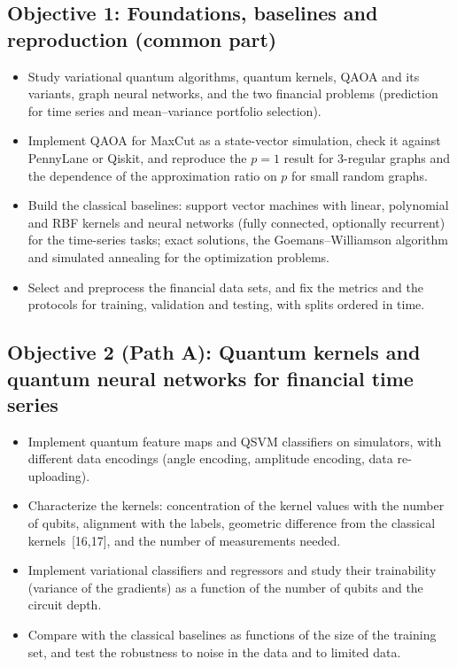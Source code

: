 \documentclass[12pt,a4paper]{article}
\begin{document}
\subsection*{Objective 1: Foundations, baselines and reproduction (common part)}
\begin{itemize}
  \item Study variational quantum algorithms, quantum kernels, QAOA
  and its variants, graph neural networks, and the two financial
  problems (prediction for time series and mean--variance portfolio
  selection).
  \item Implement QAOA for MaxCut as a state-vector simulation, check
  it against PennyLane or Qiskit, and reproduce the $p=1$ result for
  3-regular graphs and the dependence of the approximation ratio on
  $p$ for small random graphs.
  \item Build the classical baselines: support vector machines with
  linear, polynomial and RBF kernels and neural networks (fully
  connected, optionally recurrent) for the time-series tasks; exact
  solutions, the Goemans--Williamson algorithm and simulated annealing
  for the optimization problems.
  \item Select and preprocess the financial data sets, and fix the
  metrics and the protocols for training, validation and testing, with
  splits ordered in time.
\end{itemize}

\subsection*{Objective 2 (Path A): Quantum kernels and quantum neural networks for financial time series}
\begin{itemize}
  \item Implement quantum feature maps and QSVM classifiers on
  simulators, with different data encodings (angle encoding, amplitude
  encoding, data re-uploading).
  \item Characterize the kernels: concentration of the kernel values
  with the number of qubits, alignment with the labels, geometric
  difference from the classical kernels~[16,17], and the number of
  measurements needed.
  \item Implement variational classifiers and regressors and study
  their trainability (variance of the gradients) as a function of the
  number of qubits and the circuit depth.
  \item Compare with the classical baselines as functions of the size
  of the training set, and test the robustness to noise in the data
  and to limited data.
\end{itemize}
\end{document}
